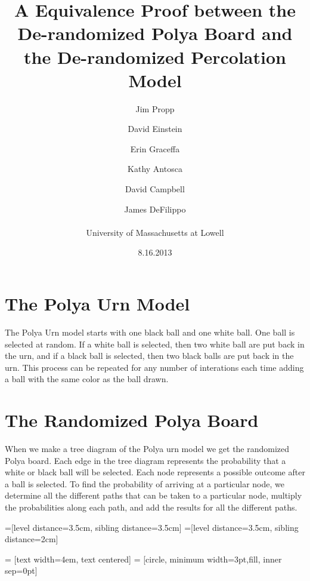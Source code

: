 \documentclass[11pt]{article}
\begin{document}
\title{A Equivalence Proof between the De-randomized Polya Board and the De-randomized Percolation Model}

\author{Jim Propp \and David Einstein \and Erin Graceffa \and Kathy Antosca \and David Campbell \and James DeFilippo \\ \\ University of Massachusetts at Lowell}
\date{8.16.2013}
\maketitle
{}


\section{The Polya Urn Model}
The Polya Urn model starts with one black ball and one white ball. One ball is selected at random. If a white ball is selected, then two white ball are put back in the urn, and if a black ball is selected, then two black balls are put back in the urn. This process can be repeated for any number of interations each time adding a ball with the same color as the ball drawn.

\section{The Randomized Polya Board}
When we make a tree diagram of the Polya urn model we get the randomized Polya board. Each edge in the tree diagram represents the probability that a white or black ball will be selected. Each node represents a possible outcome after a ball is selected. To find the probability of arriving at a particular node, we determine all the different paths that can be taken to a particular node, multiply the probabilities along each path, and add the results for all the different paths. \newline

=[level distance=3.5cm, sibling distance=3.5cm]
=[level distance=3.5cm, sibling distance=2cm]

 = [text width=4em, text centered]
 = [circle, minimum width=3pt,fill, inner sep=0pt]
\end{document}
